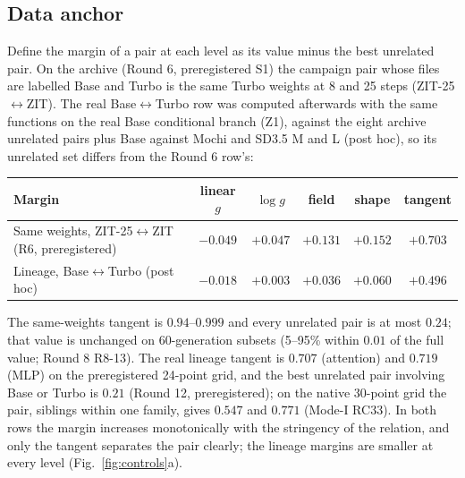 \documentclass[11pt]{article}
\theoremstyle{definition}
\newcommand{\TT}{ZIT-25}%
\begin{document}
\subsection{Data anchor}
Define the margin of a pair at each level as its value minus the best unrelated pair. On the archive (Round 6, preregistered S1) the campaign pair whose files are labelled Base and Turbo is the same Turbo weights at 8 and 25 steps (\TT{}$\leftrightarrow$ZIT). The real Base$\leftrightarrow$Turbo row was computed afterwards with the same functions on the real Base conditional branch (Z1), against the eight archive unrelated pairs plus Base against Mochi and SD3.5 M and L (post hoc), so its unrelated set differs from the Round 6 row's:
\begin{center}\small
\begin{tabular}{lccccc}
\toprule
Margin & linear $g$ & $\log g$ & field & shape & tangent\\
\midrule
Same weights, \TT{}$\leftrightarrow$ZIT (R6, preregistered) & $-0.049$ & $+0.047$ & $+0.131$ & $+0.152$ & $+0.703$\\
Lineage, Base$\leftrightarrow$Turbo (post hoc) & $-0.018$ & $+0.003$ & $+0.036$ & $+0.060$ & $+0.496$\\
\bottomrule
\end{tabular}
\end{center}
The same-weights tangent is $0.94$--$0.999$ and every unrelated pair is at most $0.24$; that value is unchanged on 60-generation subsets (5--95\% within $0.01$ of the full value; Round 8 R8-13). The real lineage tangent is $0.707$ (attention) and $0.719$ (MLP) on the preregistered 24-point grid, and the best unrelated pair involving Base or Turbo is $0.21$ (Round 12, preregistered); on the native 30-point grid the pair, siblings within one family, gives $0.547$ and $0.771$ (Mode-I RC33). In both rows the margin increases monotonically with the stringency of the relation, and only the tangent separates the pair clearly; the lineage margins are smaller at every level (Fig.~\ref{fig:controls}a).
\end{document}
